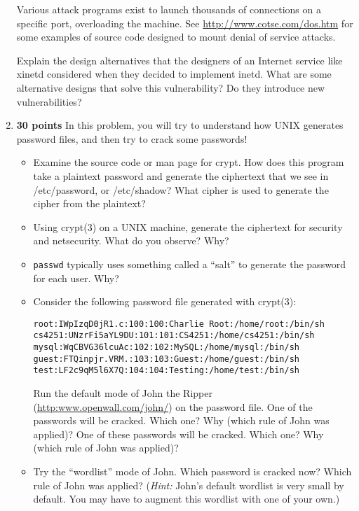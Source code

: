 \documentclass[11pt]{article}
\begin{document}
\begin{enumerate}
Various attack programs exist to launch thousands of connections on a
specific port, overloading the machine.  See
\url{http://www.cotse.com/dos.htm} for some examples of source code
designed to mount denial of service attacks.  

Explain the design alternatives that the designers of an Internet
service like xinetd considered when they decided to implement inetd.
What are some alternative designs that solve this vulnerability?  Do
they introduce new vulnerabilities?


\item  {\bf 30 points} In this problem, you will try to understand how UNIX generates
  password files, and then try to crack some passwords!
\begin{itemize}
\item Examine the source code or man page for crypt.  How does this
  program take a plaintext password and generate the ciphertext that we
  see in /etc/password, or /etc/shadow? What cipher is used to generate
  the cipher from the plaintext?

\item Using crypt(3) on a UNIX machine, generate the ciphertext for security
and netsecurity. What do you observe? Why? 

\item {\tt passwd} typically uses something called a “salt” to generate
  the password for each user. Why? 

\item
Consider the following password file generated with crypt(3):
\begin{verbatim}
root:IWpIzqD0jR1.c:100:100:Charlie Root:/home/root:/bin/sh 
cs4251:UNzrFi5aYL9DU:101:101:CS4251:/home/cs4251:/bin/sh 
mysql:WqCBVG36lcuAc:102:102:MySQL:/home/mysql:/bin/sh 
guest:FTQinpjr.VRM.:103:103:Guest:/home/guest:/bin/sh 
test:LF2c9qM5l6X7Q:104:104:Testing:/home/test:/bin/sh
\end{verbatim}

Run the default mode of John the Ripper
(\url{http:www.openwall.com/john/}) on the password file.  One of the
passwords will be cracked.  Which one?  Why (which rule of John was
applied)?  One of these passwords will be cracked. Which one? Why (which
rule of John was applied)?

\item Try the ``wordlist'' mode of John.  Which password is cracked now?
  Which rule of John was applied?  ({\em Hint:} John's default wordlist
  is very small by default.  You may have to augment this wordlist with
  one of your own.)


\end{itemize}
\end{enumerate}
\end{document}
